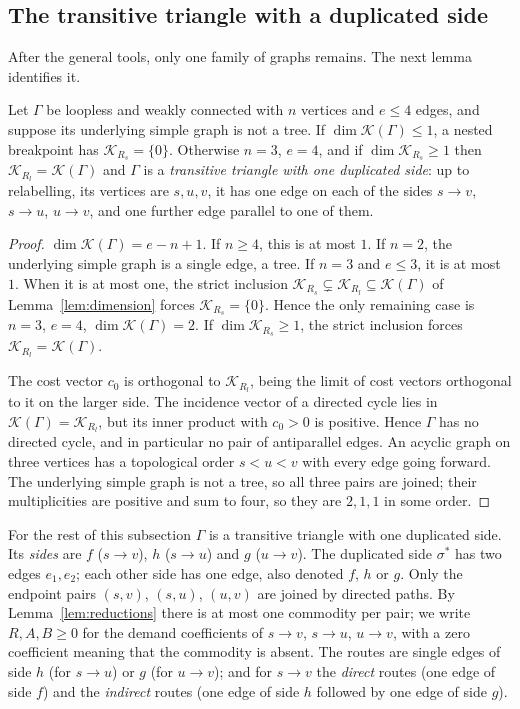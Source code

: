 \subsection{The transitive triangle with a duplicated side}

After the general tools, only one family of graphs remains. The next lemma
identifies it.

\begin{lemma}\label{lem:graphs}
Let $\Gamma$ be loopless and weakly connected with $n$ vertices and $e\le4$
edges, and suppose its underlying simple graph is not a tree. If
$\dim\mathcal K(\Gamma)\le1$, a nested breakpoint has
$\mathcal K_{R_s}=\{0\}$. Otherwise $n=3$, $e=4$, and if
$\dim\mathcal K_{R_s}\ge1$ then $\mathcal K_{R_l}=\mathcal K(\Gamma)$ and
$\Gamma$ is a \emph{transitive triangle with one duplicated side}: up to
relabelling, its vertices are $s,u,v$, it has one edge on each of the sides
$s\to v$, $s\to u$, $u\to v$, and one further edge parallel to one of them.
\end{lemma}

\begin{proof}
$\dim\mathcal K(\Gamma)=e-n+1$. If $n\ge4$, this is at most $1$. If $n=2$,
the underlying simple graph is a single edge, a tree. If $n=3$ and $e\le3$, it
is at most $1$. When it is at most one, the strict inclusion
$\mathcal K_{R_s}\subsetneq\mathcal K_{R_l}\subseteq\mathcal K(\Gamma)$ of
Lemma~\ref{lem:dimension} forces $\mathcal K_{R_s}=\{0\}$. Hence the only
remaining case is $n=3$, $e=4$, $\dim\mathcal K(\Gamma)=2$. If
$\dim\mathcal K_{R_s}\ge1$, the strict inclusion forces
$\mathcal K_{R_l}=\mathcal K(\Gamma)$.

The cost vector $c_0$ is orthogonal to $\mathcal K_{R_l}$, being the limit of
cost vectors orthogonal to it on the larger side. The incidence vector of a
directed cycle lies in $\mathcal K(\Gamma)=\mathcal K_{R_l}$, but its inner
product with $c_0>0$ is positive. Hence $\Gamma$ has no directed cycle, and
in particular no pair of antiparallel edges. An acyclic graph on three
vertices has a topological order $s<u<v$ with every edge going forward. The
underlying simple graph is not a tree, so all three pairs are joined; their
multiplicities are positive and sum to four, so they are $2,1,1$ in some
order.
\end{proof}

For the rest of this subsection $\Gamma$ is a transitive triangle with one
duplicated side. Its \emph{sides} are $f$ ($s\to v$), $h$ ($s\to u$) and $g$
($u\to v$). The duplicated side $\sigma^*$ has two edges $e_1,e_2$; each other
side has one edge, also denoted $f$, $h$ or $g$. Only the endpoint pairs
$(s,v)$, $(s,u)$, $(u,v)$ are joined by directed paths. By
Lemma~\ref{lem:reductions} there is at most one commodity per pair; we write
$R,A,B\ge0$ for the demand coefficients of $s\to v$, $s\to u$, $u\to v$,
with a zero coefficient meaning that the commodity is absent. The routes are
single edges of side $h$ (for $s\to u$) or $g$ (for $u\to v$); and for
$s\to v$ the \emph{direct} routes (one edge of side $f$) and the
\emph{indirect} routes (one edge of side $h$ followed by one edge of side
$g$).

